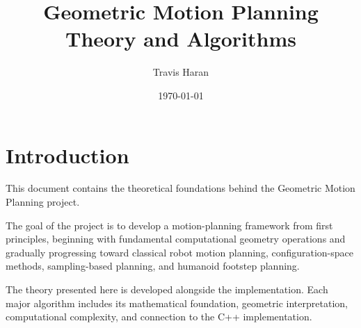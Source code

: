\documentclass[11pt]{article}
\title{\textbf{Geometric Motion Planning}\\[0.35em]\large Theory and Algorithms}
\author{Travis Haran}
\date{\today}
\begin{document}
\maketitle
\thispagestyle{empty}
\clearpage

\tableofcontents
\clearpage

\setcounter{page}{1}

\section{Introduction}

This document contains the theoretical foundations behind the
Geometric Motion Planning project.

The goal of the project is to develop a motion-planning framework
from first principles, beginning with fundamental computational
geometry operations and gradually progressing toward classical
robot motion planning, configuration-space methods, sampling-based
planning, and humanoid footstep planning.

The theory presented here is developed alongside the implementation.
Each major algorithm includes its mathematical foundation, geometric
interpretation, computational complexity, and connection to the C++
implementation.










\end{document}
